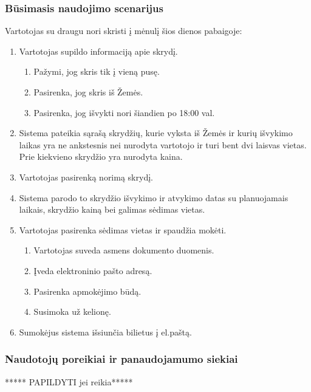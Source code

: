 \documentclass{VUMIFPSkursinis}
\begin{document}
\subsubsection{Būsimasis naudojimo scenarijus}
Vartotojas su draugu nori skristi į mėnulį šios dienos pabaigoje:
\begin{enumerate}
\item  Vartotojas supildo informaciją apie skrydį.
\begin{enumerate}[label*=\arabic*.]
\item Pažymi, jog skris tik į vieną pusę.
\item Pasirenka, jog skris iš Žemės.
\item  Pasirenka, jog išvykti nori šiandien po 18:00 val.
\end{enumerate}
\item  Sistema pateikia sąrašą skrydžių, kurie vyksta iš Žemės ir kurių išvykimo laikas yra ne ankstesnis nei nurodyta vartotojo ir turi bent dvi laisvas vietas. Prie kiekvieno skrydžio yra nurodyta kaina.
\item Vartotojas pasirenką norimą skrydį.
\item Sistema parodo to skrydžio išvykimo ir atvykimo datas su planuojamais laikais, skrydžio kainą bei galimas sėdimas vietas.
\item Vartotojas pasirenka sėdimas vietas ir spaudžia mokėti.
\begin{enumerate}[label*=\arabic*.]
\item Vartotojas suveda asmens dokumento duomenis.
\item Įveda elektroninio pašto adresą.
\item Pasirenka apmokėjimo būdą.
\item  Susimoka už kelionę.
\end{enumerate}
\item   Sumokėjus sistema išsiunčia  bilietus į el.paštą.
\end{enumerate}

\subsubsection{Naudotojų poreikiai ir panaudojamumo siekiai}
\centerline{***** PAPILDYTI jei reikia*****}


\printbibliography[heading=bibintoc, title=Šaltiniai]  %
\end{document}
